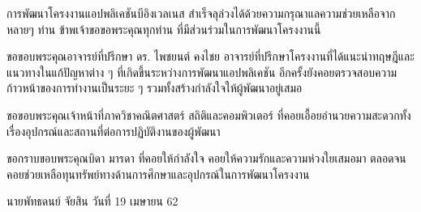 \begin{acknowledgements} %
	การพัฒนาโครงงานแอปพลิเคชันบีอิงเวลเนส สำเร็จลุล่วงได้ด้วยความกรุณาแลความช่วยเหลือจากหลายๆ ท่าน ข้าพเจ้าขอขอพระคุณทุกท่าน ที่มีส่วนร่วมในการพัฒนาโครงงานนี้
	
    ขอขอบพระคุณอาจารย์ที่ปรึกษา ดร. ไพชยนต์ คงไชย  อาจารย์ที่ปรึกษาโครงงานที่ได้แนะนำทฤษฎีและแนวทางในแก้ปัญหาต่าง ๆ  ที่เกิดขึ้นระหว่างการพัฒนาแอปพลิเคชัน อีกครั้งยังคอยตรวจสอบความก้าวหน้าของการทำงานเป็นระยะ ๆ รวมทั้งสร้างกำลังใจให้ผู้พัฒนาอยู่เสมอ
    
    ขอขอบพระคุณเจ้าหน้าที่ภาควิชาคณิตศาสตร์ สถิติและคอมพิวเตอร์ ที่คอยเอื้อยอำนวยความสะดวกทั้งเรื่องอุปกรณ์และสถานที่ต่อการปฏิบัติงานของผู้พัฒนา
   
    ขอกราบขอบพระคุณบิดา มารดา ที่คอยให้กำลังใจ คอยให้ความรักและความห่วงใยเสมอมา
    ตลอดจนคอยช่วยเหลือทุนทรัพย์ทางด้านการศึกษาและอุปกรณ์ในการพัฒนาโครงงาน

    
\end{acknowledgements}

\begin{flushright}
    นายพัทธดนย์ จัยสิน
    \vspace{-5mm}
    วันที่ 19 เมษายน 62
\end{flushright}
